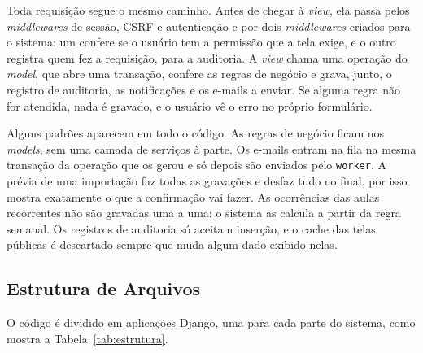 Toda requisição segue o mesmo caminho. Antes de chegar à \textit{view}, ela passa pelos \textit{middlewares} de sessão, CSRF e autenticação e por dois \textit{middlewares} criados para o sistema: um confere se o usuário tem a permissão que a tela exige, e o outro registra quem fez a requisição, para a auditoria. A \textit{view} chama uma operação do \textit{model}, que abre uma transação, confere as regras de negócio e grava, junto, o registro de auditoria, as notificações e os e-mails a enviar. Se alguma regra não for atendida, nada é gravado, e o usuário vê o erro no próprio formulário.

Alguns padrões aparecem em todo o código. As regras de negócio ficam nos \textit{models}, sem uma camada de serviços à parte. Os e-mails entram na fila na mesma transação da operação que os gerou e só depois são enviados pelo \texttt{worker}. A prévia de uma importação faz todas as gravações e desfaz tudo no final, por isso mostra exatamente o que a confirmação vai fazer. As ocorrências das aulas recorrentes não são gravadas uma a uma: o sistema as calcula a partir da regra semanal. Os registros de auditoria só aceitam inserção, e o cache das telas públicas é descartado sempre que muda algum dado exibido nelas.

\subsection{Estrutura de Arquivos}
\label{sec:resultado-estrutura}

O código é dividido em aplicações Django, uma para cada parte do sistema, como mostra a Tabela~\ref{tab:estrutura}.

